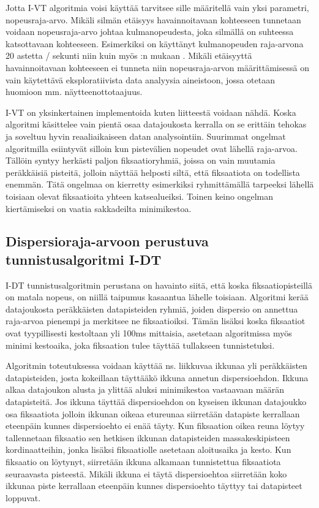 Jotta I-VT algoritmia voisi käyttää tarvitsee sille määritellä vain yksi parametri, nopeusraja-arvo. Mikäli silmän etäisyys havainnoitavaan kohteeseen tunnetaan voidaan nopeusraja-arvo johtaa kulmanopeudesta, joka silmällä on suhteessa katsottavaan kohteeseen. Esimerkiksi \citet[s. 1099]{itti2005} on käyttänyt kulmanopeuden raja-arvona 20 astetta / sekunti niin kuin myös \citet[s. 73]{salvucci2000}:n mukaan \citep[s. 103-111]{megaw1984}.
Mikäli etäisyyttä havainnoitavaan kohteeseen ei tunneta niin nopeusraja-arvon määrittämisessä on vain käytettävä eksploratiivista data analyysia aineistoon, jossa otetaan huomioon mm. näytteenottotaajuus.

I-VT on yksinkertainen implementoida kuten liitteestä \emph{}  voidaan nähdä. Koska algoritmi käsittelee vain pientä osaa datajoukosta kerralla on se erittäin tehokas ja soveltuu hyvin reaaliaikaiseen datan analysointiin. \citep[s. 76]{salvucci2000} Suurimmat ongelmat algoritmilla esiintyvät silloin kun pistevälien nopeudet ovat lähellä raja-arvoa. Tällöin syntyy herkästi paljon fiksaatioryhmiä, joissa on vain muutamia peräkkäisiä pisteitä, jolloin näyttää helposti siltä, että fiksaatiota on todellista enemmän. Tätä ongelmaa on kierretty esimerkiksi ryhmittämällä tarpeeksi lähellä toisiaan olevat fiksaatioita yhteen katsealueiksi. \citep[s. 329]{just1980} Toinen keino ongelman kiertämiseksi on vaatia sakkadeilta minimikestoa. \citep[s. 103-111]{megaw1984}

\subsection{Dispersioraja-arvoon perustuva tunnistusalgoritmi I-DT}
I-DT tunnistusalgoritmin perustana on havainto siitä, että koska fiksaatiopisteillä on matala nopeus, on niillä taipumus kasaantua lähelle toisiaan. Algoritmi kerää datajoukosta peräkkäisten datapisteiden ryhmiä, joiden dispersio on annettua raja-arvoa pienempi ja merkitsee ne fiksaatioiksi. Tämän lisäksi koska fiksaatiot ovat tyypillisesti kestoltaan yli 100ms mittaisia, asetetaan algoritmissa myös minimi kestoaika, joka fiksaation tulee täyttää tullakseen tunnistetuksi. \citep[s. 74]{salvucci2000}

Algoritmin toteutuksessa voidaan käyttää ns. liikkuvaa ikkunaa yli peräkkäisten datapisteiden, josta kokeillaan täyttääkö ikkuna annetun dispersioehdon. Ikkuna alkaa datajoukon alusta ja ylittää aluksi minimikestoa vastaavaan määrän datapisteitä. Jos ikkuna täyttää dispersioehdon on kyseisen ikkunan datajoukko osa fiksaatiota jolloin ikkunan oikeaa etureunaa siirretään datapiste kerrallaan eteenpäin kunnes dispersioehto ei enää täyty. Kun fiksaation oikea reuna löytyy tallennetaan fiksaatio sen hetkisen ikkunan datapisteiden massakeskipisteen kordinaatteihin, jonka lisäksi fiksaatiolle asetetaan aloitusaika ja kesto. Kun fiksaatio on löytynyt, siirretään ikkuna alkamaan tunnistettua fiksaatiota seuraavasta pisteestä. Mikäli ikkuna ei täytä dispersioehtoa siirretään koko ikkunaa piste kerrallaan eteenpäin kunnes dispersioehto täyttyy tai datapisteet loppuvat. \citep[s.26-27]{gale1984}

